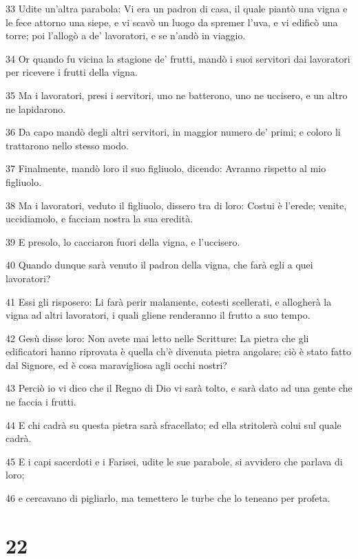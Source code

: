 \par 33 Udite un'altra parabola: Vi era un padron di casa, il quale piantò una vigna e le fece attorno una siepe, e vi scavò un luogo da spremer l'uva, e vi edificò una torre; poi l'allogò a de' lavoratori, e se n'andò in viaggio.
\par 34 Or quando fu vicina la stagione de' frutti, mandò i suoi servitori dai lavoratori per ricevere i frutti della vigna.
\par 35 Ma i lavoratori, presi i servitori, uno ne batterono, uno ne uccisero, e un altro ne lapidarono.
\par 36 Da capo mandò degli altri servitori, in maggior numero de' primi; e coloro li trattarono nello stesso modo.
\par 37 Finalmente, mandò loro il suo figliuolo, dicendo: Avranno rispetto al mio figliuolo.
\par 38 Ma i lavoratori, veduto il figliuolo, dissero tra di loro: Costui è l'erede; venite, uccidiamolo, e facciam nostra la sua eredità.
\par 39 E presolo, lo cacciaron fuori della vigna, e l'uccisero.
\par 40 Quando dunque sarà venuto il padron della vigna, che farà egli a quei lavoratori?
\par 41 Essi gli risposero: Li farà perir malamente, cotesti scellerati, e allogherà la vigna ad altri lavoratori, i quali gliene renderanno il frutto a suo tempo.
\par 42 Gesù disse loro: Non avete mai letto nelle Scritture: La pietra che gli edificatori hanno riprovata è quella ch'è divenuta pietra angolare; ciò è stato fatto dal Signore, ed è cosa maravigliosa agli occhi nostri?
\par 43 Perciò io vi dico che il Regno di Dio vi sarà tolto, e sarà dato ad una gente che ne faccia i frutti.
\par 44 E chi cadrà su questa pietra sarà sfracellato; ed ella stritolerà colui sul quale cadrà.
\par 45 E i capi sacerdoti e i Farisei, udite le sue parabole, si avvidero che parlava di loro;
\par 46 e cercavano di pigliarlo, ma temettero le turbe che lo teneano per profeta.

\chapter{22}

